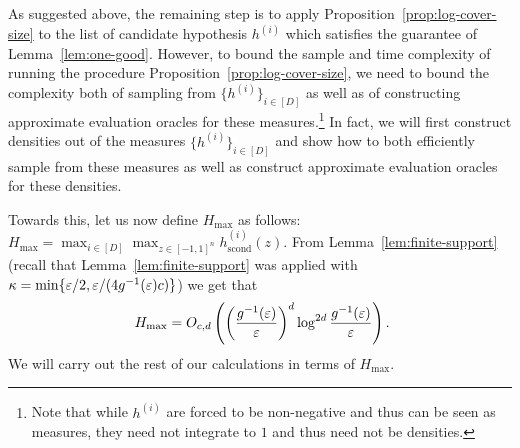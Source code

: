 
As suggested above, the remaining step is to apply Proposition~\ref{prop:log-cover-size} to the list of candidate hypothesis ${h}^{(i)}$ which satisfies the guarantee of Lemma~\ref{lem:one-good}. However, to bound the sample and time complexity of running the procedure Proposition~\ref{prop:log-cover-size}, we need to bound the complexity  both of sampling from $\{{h}^{(i)}\}_{i \in [D]}$ as well as of constructing approximate evaluation oracles for these measures.\footnote{Note that while ${h}^{(i)}$ are forced to be non-negative and thus can be seen as measures, they need not integrate to $1$ and thus need not be densities.}
In fact, we will first construct densities out of the measures $\{{h}^{(i)}\}_{i \in [D]}$ and show how to both efficiently sample from these measures as well as construct approximate evaluation oracles for these densities. 

Towards this, let us now define $H_{\max}$ as follows: $H_{\max} = \max_{i \in [D]} \max_{z \in [-1,1]^n} {h}_{\mathrm{scond}}^{(i)}(z)$.  From Lemma~\ref{lem:finite-support} (recall that Lemma~\ref{lem:finite-support} was applied with $\kappa = \min\{\varepsilon{/2},\varepsilon/(4g^{-1}(\varepsilon)c)\}$) we get that
\begin{equation}~\label{eq:H-max-val}H_{\max}=
  O_{c,d}\left( \left( {\frac {g^{-1}(\varepsilon)}{\varepsilon}} \right)^d \log^{2d} \frac{g^{-1}(\varepsilon)}{\varepsilon} \right).
\end{equation}
We will carry out the rest of our calculations in terms of $H_{\max}$.

